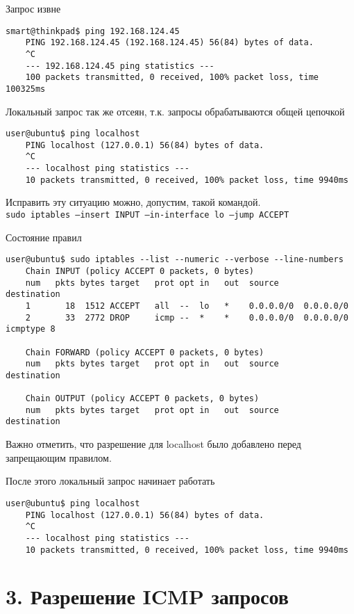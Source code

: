 Запрос извне
\begin{Verbatim}[frame=single]
    smart@thinkpad$ ping 192.168.124.45
    PING 192.168.124.45 (192.168.124.45) 56(84) bytes of data.
    ^C
    --- 192.168.124.45 ping statistics ---
    100 packets transmitted, 0 received, 100% packet loss, time 100325ms
\end{Verbatim}

Локальный запрос так же отсеян, т.к. запросы обрабатываются общей цепочкой
\begin{Verbatim}[frame=single]
    user@ubuntu$ ping localhost 
    PING localhost (127.0.0.1) 56(84) bytes of data.
    ^C
    --- localhost ping statistics ---
    10 packets transmitted, 0 received, 100% packet loss, time 9940ms
\end{Verbatim}

Исправить эту ситуацию можно, допустим, такой командой.\\
\texttt{sudo iptables --insert INPUT --in-interface lo --jump ACCEPT}

Состояние правил
\begin{Verbatim}[frame=single]
    user@ubuntu$ sudo iptables --list --numeric --verbose --line-numbers
    Chain INPUT (policy ACCEPT 0 packets, 0 bytes)
    num   pkts bytes target   prot opt in   out  source     destination
    1       18  1512 ACCEPT   all  --  lo   *    0.0.0.0/0  0.0.0.0/0   
    2       33  2772 DROP     icmp --  *    *    0.0.0.0/0  0.0.0.0/0    icmptype 8

    Chain FORWARD (policy ACCEPT 0 packets, 0 bytes)
    num   pkts bytes target   prot opt in   out  source     destination

    Chain OUTPUT (policy ACCEPT 0 packets, 0 bytes)
    num   pkts bytes target   prot opt in   out  source     destination
\end{Verbatim}

Важно отметить, что разрешение для localhost было добавлено перед запрещающим правилом.

После этого локальный запрос начинает работать
\begin{Verbatim}[frame=single]
    user@ubuntu$ ping localhost 
    PING localhost (127.0.0.1) 56(84) bytes of data.
    ^C
    --- localhost ping statistics ---
    10 packets transmitted, 0 received, 100% packet loss, time 9940ms
\end{Verbatim}

\section*{3. Разрешение ICMP запросов}

